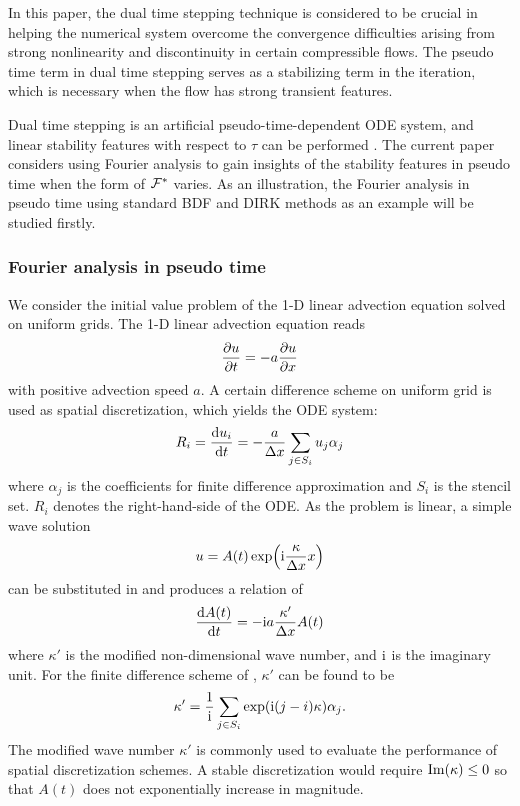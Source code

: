 In this paper, the dual time stepping technique is considered to be crucial
in helping the numerical system overcome the convergence difficulties
arising from strong nonlinearity and discontinuity
in certain compressible flows.
The pseudo time term in dual time stepping
serves as a stabilizing term in the iteration,
which is necessary when the flow has strong transient features.

Dual time stepping  is an artificial
pseudo-time-dependent ODE system, and linear stability features with
respect to $\tau$ can be performed \cite{jameson1991time}.
The current paper considers using Fourier analysis
to gain insights of the stability features in pseudo time
when the form of $\mathcal{F}^*$ varies.
As an illustration, the
Fourier analysis in pseudo time using standard BDF and DIRK
methods as an example will be studied firstly.


\subsubsection{Fourier analysis in pseudo time}
\label{sssec:fourier}

We consider the initial value problem of the 1-D
linear advection equation
solved on uniform
grids.
The 1-D linear advection equation reads
\begin{equation}
    \partialderivative{u}{t} = -a \partialderivative{u}{x}
\end{equation}
with positive advection speed $a$.
A certain difference scheme on uniform grid 
is used as spatial discretization, which
yields the ODE system:
\begin{equation}
    R_i=\derivative{u_i}{t} = -\frac{a}{\inc x} \sum_{j\in S_i}u_j\alpha_j
    \label{eq:fd}
\end{equation}
where $\alpha_j$ is the coefficients for finite difference approximation
and $S_i$ is the stencil set. $R_i$ denotes the right-hand-side of the ODE.
As the problem is linear,
a simple wave solution
\begin{equation}
    u = A(t)\exp(\mathrm{i} \frac{\kappa}{{\Delta} x} x)
\end{equation}
can be substituted in  and produces
a relation of
\begin{equation}
    \frac{\dd A(t)}{\dd t} = -\mathrm{i} a\frac{\kappa'}{{\Delta} x}  A(t)
\end{equation}
where $\kappa'$ is the modified non-dimensional wave number,
and $\mathrm{i}$ is the imaginary unit.
For the finite difference scheme of ,
$\kappa'$ can be found to be
\begin{equation}
    \kappa' = \frac{1}{\mathrm{i}} \sum_{j\in S_i}\exp(\mathrm{i} (j-i)\kappa)\alpha_j.
\end{equation}
The modified wave number $\kappa'$ is commonly used to evaluate the performance of
spatial  discretization schemes.
A stable discretization would require $\mathrm{Im}(\kappa) \leq 0$ so that
$A(t)$ does not exponentially increase in magnitude.

